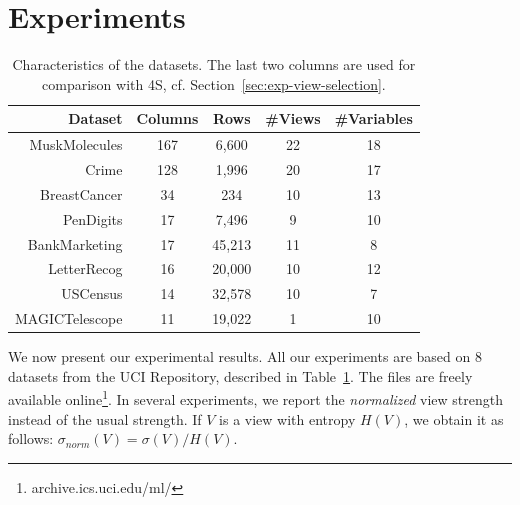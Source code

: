 \section{Experiments}
\label{sec:experiments}
\begin{table}
    \centering
    \small
    \begin{tabular}{r c c c c} 
        \hline
        Dataset & Columns & Rows & \#Views & \#Variables\\
        \hline
        MuskMolecules & 167 & 6,600 & 22 & 18\\
        Crime & 128 & 1,996 & 20 & 17\\
        BreastCancer & 34 & 234 & 10 & 13\\
        PenDigits & 17 & 7,496 & 9 & 10\\
        BankMarketing & 17 & 45,213 & 11& 8\\
        LetterRecog & 16 & 20,000 & 10 & 12\\
        USCensus & 14 & 32,578 & 10 & 7\\
        MAGICTelescope & 11 & 19,022 & 1 & 10\\
        \hline
    \end{tabular}
    \caption{Characteristics of the datasets. The last two columns are used for
    comparison with 4S, cf. Section~\ref{sec:exp-view-selection}.}
    \label{tab:datasets}
\end{table}
We now present our experimental results. All our experiments are based on 8
datasets from the UCI Repository, described in Table~\ref{tab:datasets}. The
files are freely available online\footnote{archive.ics.uci.edu/ml/}. In several
experiments, we report the \emph{normalized} view strength instead of the usual
strength. If $V$ is a view with entropy $H(V)$, we obtain it as follows:
$\sigma_{norm}(V) = \sigma(V) / H(V)$.

